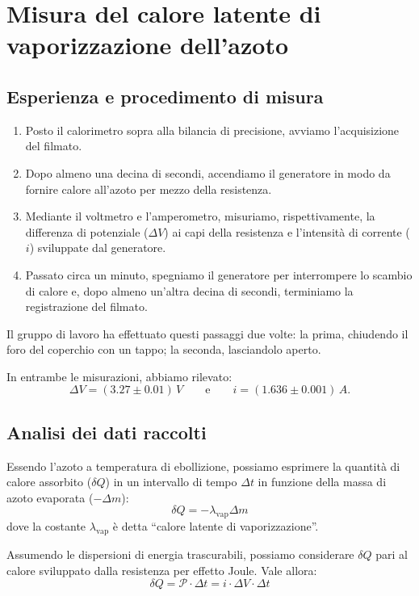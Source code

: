 \documentclass{article}
\begin{document}
\pagebreak

\section{Misura del calore latente di vaporizzazione dell'azoto}

\subsection{Esperienza e procedimento di misura}

\begin{enumerate}
  \item
    Posto il calorimetro sopra alla bilancia di precisione, avviamo
    l'acquisizione del filmato.
  \item
    Dopo almeno una decina di secondi, accendiamo il generatore
    in modo da fornire calore all'azoto per mezzo della resistenza.
  \item
    Mediante il voltmetro e l'amperometro, misuriamo, rispettivamente,
    la differenza di potenziale ($\Delta V$) ai capi della resistenza
    e l'intensità di corrente ($i$) sviluppate dal generatore.
  \item
    Passato circa un minuto, spegniamo il generatore per interrompere
    lo scambio di calore e, dopo almeno un'altra decina di secondi,
    terminiamo la registrazione del filmato.
\end{enumerate}

Il gruppo di lavoro ha effettuato questi passaggi due volte:
la prima, chiudendo il foro del coperchio con un tappo;
la seconda, lasciandolo aperto.

In entrambe le misurazioni, abbiamo rilevato:
\[
  \Delta V = (3.27\pm0.01)\,\unit{V}
  \qquad\text{e}\qquad
  i = (1.636\pm0.001)\,\unit{A}.
\]

\subsection{Analisi dei dati raccolti}

Essendo l'azoto a temperatura di ebollizione, possiamo esprimere la
quantità di calore assorbito ($\delta Q$) in un intervallo di tempo
$\Delta t$ in funzione della massa di azoto evaporata ($-\Delta m$):
\[\delta Q = - \lambda_\text{vap} \Delta m\] dove la costante
$\lambda_\text{vap}$ è detta “calore latente di vaporizzazione”.

Assumendo le dispersioni di energia trascurabili, possiamo
considerare $\delta Q$ pari al calore sviluppato dalla resistenza per
effetto Joule. Vale allora:
\[ \delta Q = \mathscr{P}\cdot\Delta t = i\cdot\Delta V\cdot\Delta t\]
\end{document}
